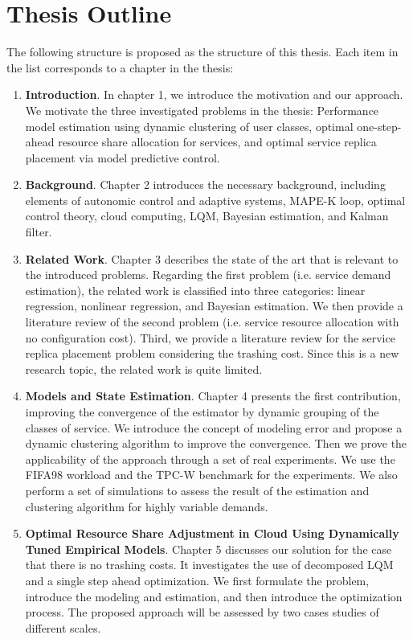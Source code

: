 \documentclass[11pt]{article}
\begin{document}
  \section{ Thesis Outline}
     The following structure is proposed as the structure of this thesis. Each item in the list corresponds to a chapter in the thesis:  
    \begin{enumerate}
    
      \item \textbf{Introduction}. In chapter 1, we introduce the motivation and our approach. We motivate the three investigated problems in the thesis:
			Performance model estimation using dynamic clustering of user classes, optimal one-step-ahead resource share allocation for services, and optimal service replica placement via model predictive control.
			
    \item \textbf{Background}. Chapter 2 introduces the necessary background, including elements of autonomic control and adaptive systems, MAPE-K loop, optimal control theory, cloud computing, LQM, Bayesian estimation, and Kalman filter. 

  \item \textbf{Related Work}. Chapter 3 describes the state of the art that is relevant to the introduced problems. Regarding the first problem (i.e. service demand estimation), the related work is classified into three categories: linear regression, nonlinear regression, and Bayesian estimation. We then provide a literature review of the second problem (i.e. service resource allocation with no configuration cost). Third, we provide a literature review for the service replica placement problem considering the trashing cost. Since this is a new research topic, the related work is quite limited.
	 
  \item  \textbf{Models and State Estimation}.  
  Chapter 4 presents the first contribution, improving the convergence of the estimator by dynamic grouping of the classes of service. We introduce the concept of modeling error and propose a dynamic clustering algorithm to improve the convergence. Then we prove the applicability of the approach through a set of real experiments. We use the FIFA98 workload and the TPC-W benchmark for the experiments. We also perform a set of simulations to assess the result of the estimation and clustering algorithm for highly variable demands.  

\item \textbf{Optimal Resource Share Adjustment in Cloud Using Dynamically Tuned Empirical Models}. Chapter 5 discusses our solution for the case that there is no trashing costs. It investigates the use of decomposed LQM and a single step ahead optimization. 
We first formulate the problem, introduce the modeling and estimation, and then introduce the optimization process. The proposed approach will be assessed by two cases studies of different scales. 


\end{enumerate}
\end{document}
